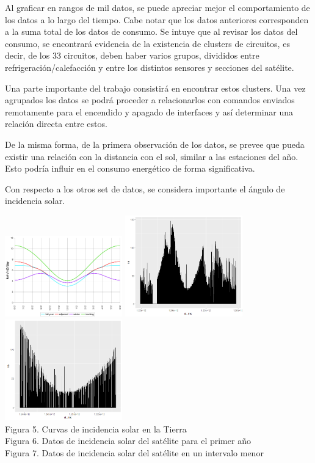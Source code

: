 \documentclass[../Main.tex]{subfiles}
\begin{document}
Al graficar en rangos de mil datos, se puede apreciar mejor el comportamiento de los datos a lo largo del tiempo. Cabe notar que los datos anteriores corresponden a la suma total de los datos de consumo. Se intuye que al revisar los datos del consumo, se encontrará evidencia de la existencia de clusters de circuitos, es decir, de los 33 circuitos, deben haber varios grupos, divididos entre refrigeración/calefacción y entre los distintos sensores y secciones del satélite.
\newline \par 
Una parte importante del trabajo consistirá en encontrar estos clusters. Una vez agrupados los datos se podrá proceder a relacionarlos con comandos enviados remotamente para el encendido y apagado de interfaces y así determinar una relación directa entre estos. 
\newline \par 
De la misma forma, de la primera observación de los datos, se prevee que pueda existir una relación con la distancia con el sol, similar a las estaciones del año. Esto podría influir en el consumo energético de forma significativa.
\newline \par 
Con respecto a los otros set de datos, se considera importante el ángulo de incidencia solar.
\begin{center}
\includegraphics[width=2in]{Assets/optsolargraph.jpg}
\includegraphics[width=2in]{Assets/saaf1saAll.png}
\includegraphics[width=2in]{Assets/saaf1500k850k.png}
\\Figura 5. Curvas de incidencia solar en la Tierra
\\Figura 6. Datos de incidencia solar del satélite para el primer año
\\Figura 7. Datos de incidencia solar del satélite en un intervalo menor
\end{center}
\end{document}
